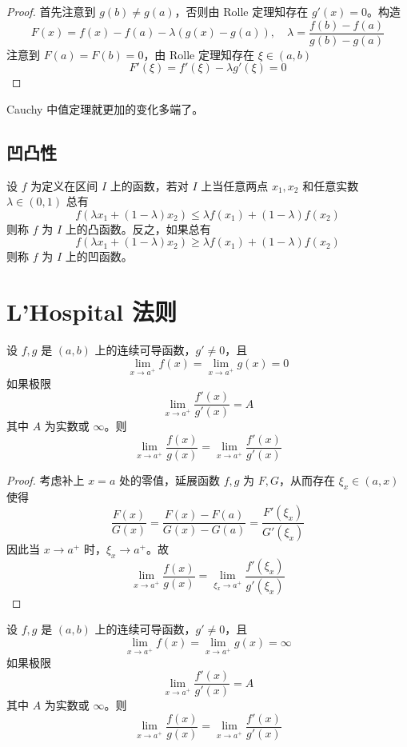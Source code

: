 \begin{proof}
	首先注意到 $g(b) \neq g(a)$，否则由 Rolle 定理知存在 $g'(x) = 0$。构造
	\[ F(x) = f(x) - f(a) - \lambda (g(x) - g(a)) , \quad \lambda = \frac{f(b) - f(a)}{g(b) - g(a)} \]
	注意到 $F(a) = F(b) = 0$，由 Rolle 定理知存在 $\xi \in (a, b)$
	\[ F'(\xi) = f'(\xi) - \lambda g'(\xi) = 0 \]
\end{proof}

Cauchy 中值定理就更加的变化多端了。

\subsection{凹凸性}

\begin{definition}
	设 $f$ 为定义在区间 $I$ 上的函数，若对 $I$ 上当任意两点 $x_1,x_2$ 和任意实数 $\lambda\in (0,1)$ 总有
	\[ f(\lambda x_1+(1-\lambda)x_2) \leqslant \lambda f(x_1)+(1-\lambda)f(x_2) \]
	则称 $f$ 为 $I$ 上的凸函数。反之，如果总有
	\[ f(\lambda x_1+(1-\lambda)x_2) \geqslant \lambda f(x_1)+(1-\lambda)f(x_2) \]
	则称 $f$ 为 $I$ 上的凹函数。
\end{definition}

\section{L'Hospital 法则}

\begin{theorem}[L'Hospital 法则，0/0 型]
	设 $f,g$ 是 $(a,b)$ 上的连续可导函数，$g' \neq 0$，且
	\[ \lim_{x \to a^{+}} f(x) = \lim_{x \to a^{+}} g(x) = 0 \]
	如果极限
	\[ \lim_{x \to a^{+}} \frac{f'(x)}{g'(x)} = A \]
	其中 $A$ 为实数或 $\infty$。则
	\[ \lim_{x \to a^{+}} \frac{f(x)}{g(x)} = \lim_{x \to a^{+}} \frac{f'(x)}{g'(x)} \]
\end{theorem}

\begin{proof}
	考虑补上 $x=a$ 处的零值，延展函数 $f, g$ 为 $F, G$，从而存在 $\xi_x \in (a, x)$ 使得
	\[ \frac{F(x)}{G(x)} = \frac{F(x) - F(a)}{G(x) - G(a)} = \frac{F'(\xi_x)}{G'(\xi_x)} \]
	因此当 $x \to a^+$ 时，$\xi_x \to a^+$。故
	\[ \lim_{x \to a^{+}} \frac{f(x)}{g(x)} = \lim_{\xi_x \to a^{+}} \frac{f'(\xi_x)}{g'(\xi_x)} \]
\end{proof}

\begin{theorem}[L'Hospital 法则，0/0 型]
	设 $f,g$ 是 $(a,b)$ 上的连续可导函数，$g' \neq 0$，且
	\[ \lim_{x \to a^{+}} f(x) = \lim_{x \to a^{+}} g(x) = \infty \]
	如果极限
	\[ \lim_{x \to a^{+}} \frac{f'(x)}{g'(x)} = A \]
	其中 $A$ 为实数或 $\infty$。则
	\[ \lim_{x \to a^{+}} \frac{f(x)}{g(x)} = \lim_{x \to a^{+}} \frac{f'(x)}{g'(x)} \]
\end{theorem}

